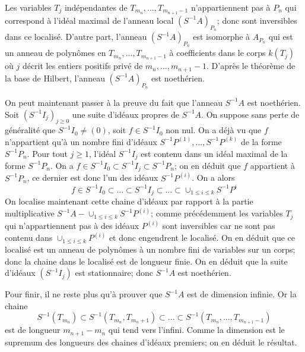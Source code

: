 \documentclass{article}
\begin{document}
Les variables $T_j$ indépendantes de $T_{m_n}, ..., T_{m_{n+1}-1}$ n'appartiennent pas à $P_n$ qui correspond à l'idéal maximal de l'anneau local $(S^{-1}A)_{P_n}$; donc sont inversibles dans ce localisé. D'autre part, l'anneau $(S^{-1}A)_{P_n}$ est isomorphe à $A_{P_n}$ qui est un anneau de polynômes en $T_{m_n}, ..., T_{m_{n+1}-1}$ à coefficients dans le corps $k(T_j)$ où $j$ décrit les entiers positifs privé de $m_n, ..., m_{n+1}-1$. D'après le théorème de la base de Hilbert, l'anneau $(S^{-1}A)_{P_n}$ est noethérien.

On peut maintenant passer à la preuve du fait que l'anneau $S^{-1}A$ est noethérien. Soit $(S^{-1}I_j)_{j \geq 0}$ une suite d'idéaux propres de $S^{-1}A$. On suppose sans perte de généralité que $S^{-1}I_0 \neq (0)$, soit $f \in S^{-1}I_0$ non nul. On a déjà vu que $f$ n'appartient qu'à un nombre fini d'idéaux $S^{-1}P^{(1)}, ..., S^{-1}P^{(k)}$ de la forme $S^{-1}P_n$. Pour tout $j \geq 1$, l'idéal $S^{-1}I_j$ est contenu dans un idéal maximal de la forme $S^{-1}P_n$. On a $f \in S^{-1}I_0 \subset S^{-1}I_j \subset S^{-1}P_n$; on en déduit que $f$ appartient à $S^{-1}P_n$, ce dernier est donc l'un des idéaux $S^{-1}P^{(i)}$.
On a alors
\begin{equation*}
f \in S^{-1}I_0 \subset ... \subset S^{-1}I_j \subset ... \subset \cup_{1 \leq i \leq k}S^{-1}P^i
\end{equation*}
On localise maintenant cette chaine d'idéaux par rapport à la partie multiplicative $S^{-1}A-\cup_{1 \leq i \leq k}S^{-1}P^{(i)}$; comme précédemment les variables $T_j$ qui n'appartiennent pas à des idéaux $P^{(i)}$ sont inversibles car ne sont pas contenu dans $\cup_{1 \leq i \leq k}P^{(i)}$ et donc engendrent le localisé. On en déduit que ce localisé est un anneau de polynômes à un nombre fini de variables sur un corps; donc la chaine dans le localisé est de longueur finie. On en déduit que la suite d'idéaux $(S^{-1}I_j)$ est stationnaire; donc $S^{-1}A$ est noethérien.

Pour finir, il ne reste plus qu'à prouver que $S^{-1}A$ est de dimension infinie. Or la chaine
\begin{equation*}
S^{-1}(T_{m_n}) \subset S^{-1}(T_{m_n}, T_{m_n+1}) \subset ... \subset S^{-1}(T_{m_n}, ..., T_{m_{n+1}-1})
\end{equation*}
est de longueur $m_{n+1} - m_n$ qui tend vers l'infini. Comme la dimension est le supremum des longueurs des chaines d'idéaux premiers; on en déduit le résultat.
\end{document}
